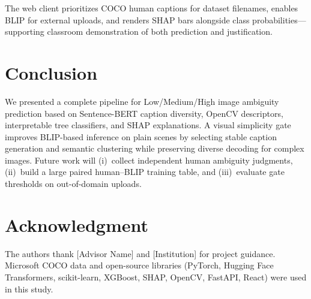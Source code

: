 \documentclass[conference]{IEEEtran}
\begin{document}
The web client prioritizes COCO human captions for dataset filenames, enables BLIP for external uploads, and renders SHAP bars alongside class probabilities---supporting classroom demonstration of both prediction and justification.

\section{Conclusion}
\label{sec:conclusion}

We presented a complete pipeline for Low/Medium/High image ambiguity prediction based on Sentence-BERT caption diversity, OpenCV descriptors, interpretable tree classifiers, and SHAP explanations. A visual simplicity gate improves BLIP-based inference on plain scenes by selecting stable caption generation and semantic clustering while preserving diverse decoding for complex images. Future work will (i)~collect independent human ambiguity judgments, (ii)~build a large paired human--BLIP training table, and (iii)~evaluate gate thresholds on out-of-domain uploads.

\section*{Acknowledgment}
The authors thank [Advisor Name] and [Institution] for project guidance. Microsoft COCO data and open-source libraries (PyTorch, Hugging Face Transformers, scikit-learn, XGBoost, SHAP, OpenCV, FastAPI, React) were used in this study.
\end{document}

